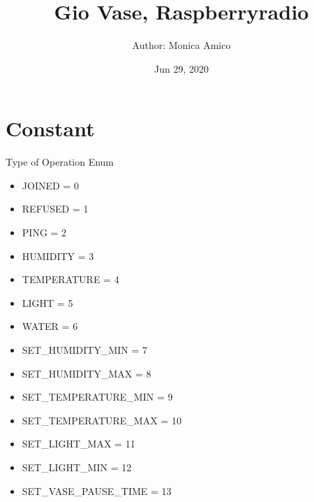 \documentclass[letterpaper,10pt,english]{sphinxmanual}
\title{Gio Vase, Raspberry\sphinxhyphen{}radio}
\date{Jun 29, 2020}
\author{Author: Monica Amico}
\begin{document}
\pagestyle{empty}
\sphinxmaketitle
\pagestyle{plain}
\sphinxtableofcontents
\pagestyle{normal}
\label{\detokenize{index::doc}}



\chapter{Constant}
\label{\detokenize{index:module-constants}}\label{\detokenize{index:constant}}

\begin{fulllineitems}
\label{\detokenize{index:constants.Operation}}
Type of Operation Enum
\begin{itemize}
\item {} 
JOINED = 0

\item {} 
REFUSED = 1

\item {} 
PING = 2

\item {} 
HUMIDITY = 3

\item {} 
TEMPERATURE = 4

\item {} 
LIGHT = 5

\item {} 
WATER = 6

\item {} 
SET\_HUMIDITY\_MIN = 7

\item {} 
SET\_HUMIDITY\_MAX = 8

\item {} 
SET\_TEMPERATURE\_MIN = 9

\item {} 
SET\_TEMPERATURE\_MAX = 10

\item {} 
SET\_LIGHT\_MAX = 11

\item {} 
SET\_LIGHT\_MIN = 12

\item {} 
SET\_VASE\_PAUSE\_TIME = 13


\end{itemize}
\end{fulllineitems}
\end{document}
